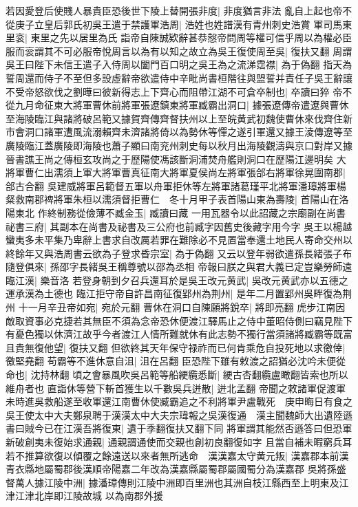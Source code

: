 若因愛登后使賤人暴貴臣恐後世下陵上替開張非度|{
	非度猶言非法}
亂自上起也帝不從庚子立皇后郭氏初吳王遣于禁護軍浩周|{
	浩姓也姓譜漢有青州刺史浩賞}
軍司馬東里衮|{
	東里之先以居里為氏}
詣帝自陳誠欵辭甚恭慤帝問周等權可信乎周以為權必臣服而衮謂其不可必服帝悅周言以為有以知之故立為吳王復使周至吳|{
	復扶又翻}
周謂吳王曰陛下未信王遣子入侍周以闔門百口明之吳王為之流涕霑襟|{
	為于偽翻}
指天為誓周還而侍子不至但多設虛辭帝欲遣侍中辛毗尚書桓階往與盟誓并責任子吳王辭讓不受帝怒欲伐之劉曄曰彼新得志上下齊心而阻帶江湖不可倉卒制也|{
	卒讀曰猝}
帝不從九月命征東大將軍曹休前將軍張遼鎮東將軍臧霸出洞口|{
	據張遼傳帝遣遼與曹休至海陵臨江與諸將破呂範又據賀齊傳齊督扶州以上至皖黄武初魏使曹休來伐齊住新市會洞口諸軍遭風流溺賴齊未濟諸將倚以為勢休等憚之遂引軍還又據王淩傳遼等至廣陵臨江蓋廣陵即海陵也蕭子顯曰南兖州刺史每以秋月出海陵觀濤與京口對岸又據晉書譙王尚之傳桓玄攻尚之于歷陽使馮該斷洞浦焚舟艦則洞口在歷陽江邊明矣}
大將軍曹仁出濡須上軍大將軍曹真征南大將軍夏侯尚左將軍張郃右將軍徐晃圍南郡|{
	郃古合翻}
吳建威將軍呂範督五軍以舟軍拒休等左將軍諸葛瑾平北將軍潘璋將軍楊粲救南郡禆將軍朱桓以濡須督拒曹仁　冬十月甲子表首陽山東為壽陵|{
	首陽山在洛陽東北}
作終制務從儉薄不臧金玉|{
	臧讀曰藏}
一用瓦器令以此詔藏之宗廟副在尚書祕書三府|{
	其副本在尚書及祕書及三公府也前臧字因舊史後藏字用今字}
吳王以楊越蠻夷多未平集乃卑辭上書求自改厲若罪在難除必不見置當奉還土地民人寄命交州以終餘年又與浩周書云欲為子登求昏宗室|{
	為于偽翻}
又云以登年弱欲遣孫長緒張子布隨登俱來|{
	孫邵字長緒吳王稱尊號以邵為丞相}
帝報曰朕之與君大義已定豈樂勞師遠臨江漢|{
	樂音洛}
若登身朝到夕召兵還耳於是吳王改元黄武|{
	吳改元黄武亦以五德之運承漢為土德也}
臨江拒守帝自許昌南征復郢州為荆州|{
	是年二月置郢州吳畔復為荆州}
十一月辛丑帝如宛|{
	宛於元翻}
曹休在洞口自陳願將銳卒|{
	將即亮翻}
虎步江南因敵取資事必克捷若其無臣不須為念帝恐休便渡江驛馬止之侍中董昭侍側曰竊見陛下有憂色獨以休濟江故乎今者渡江人情所難就休有此志勢不獨行當須諸將臧霸等既富且貴無復他望|{
	復扶又翻}
但欲終其天年保守禄祚而已何肯乘危自投死地以求徼倖|{
	徼堅堯翻}
苟霸等不進休意自沮|{
	沮在呂翻}
臣恐陛下雖有敕渡之詔猶必沈吟未便從命也|{
	沈持林翻}
頃之會暴風吹吳呂範等船綆纜悉斷|{
	綆古杏翻纜盧瞰翻皆索也所以維舟者也}
直詣休等營下斬首獲生以千數吳兵迸散|{
	迸北孟翻}
帝聞之敕諸軍促渡軍未時進吳救船遂至收軍還江南曹休使臧霸追之不利將軍尹盧戰死　庚申晦日有食之　吳王使太中大夫鄭泉聘于漢漢太中大夫宗瑋報之吳漢復通　漢主聞魏師大出遺陸遜書曰賊今已在江漢吾將復東|{
	遺于季翻復扶又翻下同}
將軍謂其能然否遜答曰但恐軍新破創夷未復始求通親|{
	通親謂通使而交親也創初良翻復如字}
且當自補未暇窮兵耳若不推算欲復以傾覆之餘遠送以來者無所逃命　漢漢嘉太守黄元叛|{
	漢嘉郡本前漢青衣縣地屬蜀郡後漢順帝陽嘉二年改為漢嘉縣屬蜀郡屬國蜀分為漢嘉郡}
吳將孫盛督萬人據江陵中洲|{
	據潘璋傳則江陵中洲即百里洲也其洲自枝江縣西至上明東及江津江津北岸即江陵故城}
以為南郡外援

